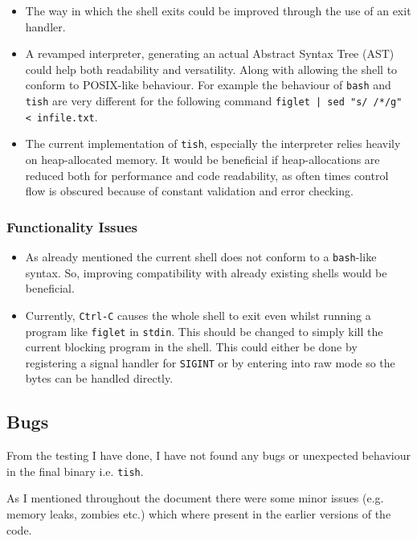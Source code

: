 \documentclass[12pt]{article}
\begin{document}
\begin{itemize}
\item
  The way in which the shell exits could be improved through the
  use of an exit handler.
\item
  A revamped interpreter, generating an actual Abstract Syntax
  Tree (AST) could help both readability and versatility. Along
  with allowing the shell to conform to POSIX-like behaviour.
  For example the behaviour of \texttt{bash} and \texttt{tish}
  are very different for the following command \texttt{figlet |
  sed "s/ /*/g" < infile.txt}.
\item
  The current implementation of \texttt{tish}, especially the
  interpreter relies heavily on heap-allocated memory. It would
  be beneficial if heap-allocations are reduced both for
  performance and code readability, as often times
  control flow is obscured because of constant validation and
  error checking.
\end{itemize}

\subsubsection{Functionality Issues}

\begin{itemize}
\item
  As already mentioned the current shell does not conform to a
  \texttt{bash}-like syntax. So, improving compatibility with
  already existing shells would be beneficial.
\item
  Currently, \texttt{Ctrl-C} causes the whole shell to exit even
  whilst running a program like \texttt{figlet} in
  \texttt{stdin}. This should be changed to simply kill the
  current blocking program in the shell. This could either be
  done by registering a signal handler for \texttt{SIGINT} or by
  entering into raw mode so the bytes can be handled directly.
\end{itemize}

\subsection{Bugs}

From the testing I have done, I have not found any bugs or
unexpected behaviour in the final binary i.e. \texttt{tish}.

As I mentioned throughout the document there were some minor
issues (e.g. memory leaks, zombies etc.) which where present in
the earlier versions of the code.
\end{document}
